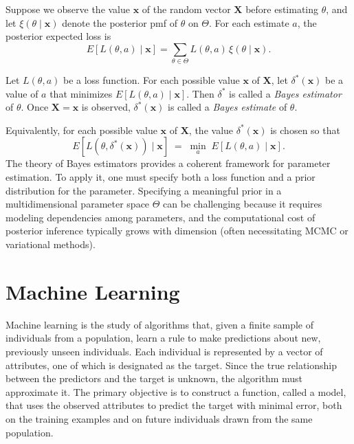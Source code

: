 Suppose we observe the value $\mathbf{x}$ of the random vector $\mathbf{X}$ before estimating $\theta$, and let $\xi\left(\theta\mid\mathbf{x}\right)$ denote the posterior pmf of $\theta$ on $\Theta$. For each estimate $a$, the posterior expected loss is
\[
E\!\left[L\left(\theta,a\right)\mid\mathbf{x}\right]=\sum_{\theta \in \Theta} L\left(\theta,a\right)\,\xi\left(\theta\mid\mathbf{x}\right).
\]

\begin{definition}
Let $L\left(\theta,a\right)$ be a loss function. For each possible value $\mathbf{x}$ of $\mathbf{X}$, let $\delta^{\ast}\left(\mathbf{x}\right)$ be a value of $a$ that minimizes $E\!\left[L\left(\theta,a\right)\mid\mathbf{x}\right]$. Then $\delta^{\ast}$ is called a \emph{Bayes estimator} of $\theta$. Once $\mathbf{X}=\mathbf{x}$ is observed, $\delta^{\ast}\left(\mathbf{x}\right)$ is called a \emph{Bayes estimate} of $\theta$.
\end{definition}

Equivalently, for each possible value $\mathbf{x}$ of $\mathbf{X}$, the value $\delta^{\ast}\left( \mathbf{x} \right)$ is chosen so that
\[
E\!\left[L\left(\theta, \delta^{\ast}\left(\mathbf{x}\right) \right)\mid \mathbf{x} \right]
\;=\; \min_{a}\; E\!\left[L\left(\theta,a\right)\mid\mathbf{x}\right].
\]
The theory of Bayes estimators provides a coherent framework for parameter estimation. To apply it, one must specify both a loss function and a prior distribution for the parameter. Specifying a meaningful prior in a multidimensional parameter space $\Theta$ can be challenging because it requires modeling dependencies among parameters, and the computational cost of posterior inference typically grows with dimension (often necessitating MCMC or variational methods).

%
%

\section{Machine Learning}
\label{sec:machine_learning}

Machine learning is the study of algorithms that, given a finite sample of individuals from a population, learn a rule to make predictions about new, previously unseen individuals. Each individual is represented by a vector of attributes, one of which is designated as the target. Since the true relationship between the predictors and the target is unknown, the algorithm must approximate it. The primary objective is to construct a function, called a model, that uses the observed attributes to predict the target with minimal error, both on the training examples and on future individuals drawn from the same population.

